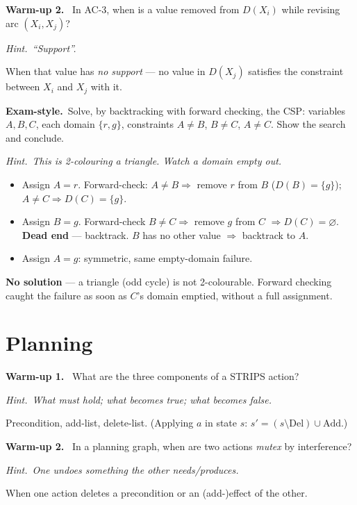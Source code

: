 \documentclass[11pt,a4paper]{article}
\newcommand{\hint}[1]{\par{\small\textcolor{accent}{\textit{Hint.}}\ \textit{#1}}\par\smallskip}
\newcommand{\warm}[1]{\smallskip\textbf{\textcolor{hi}{Warm-up #1.}}\ }
\newcommand{\exam}{\smallskip\textbf{\textcolor{warn}{Exam-style.}}\ }
\begin{document}
\warm{2} In AC-3, when is a value removed from $D(X_i)$ while revising arc $(X_i,X_j)$?
\hint{``Support''.}
\begin{sol}When that value has \emph{no support} --- no value in $D(X_j)$ satisfies the constraint between $X_i$ and $X_j$ with it.\end{sol}

\exam Solve, by backtracking with forward checking, the CSP: variables $A,B,C$, each domain $\{r,g\}$, constraints $A\ne B$, $B\ne C$, $A\ne C$. Show the search and conclude.
\hint{This is 2-colouring a triangle. Watch a domain empty out.}
\begin{sol}
\begin{itemize}[leftmargin=*,itemsep=0pt]
  \item Assign $A=r$. Forward-check: $A\ne B\Rightarrow$ remove $r$ from $B$ ($D(B)=\{g\}$); $A\ne C\Rightarrow D(C)=\{g\}$.
  \item Assign $B=g$. Forward-check $B\ne C\Rightarrow$ remove $g$ from $C$ $\Rightarrow D(C)=\varnothing$. \textbf{Dead end} --- backtrack. $B$ has no other value $\Rightarrow$ backtrack to $A$.
  \item Assign $A=g$: symmetric, same empty-domain failure.
\end{itemize}
\textbf{No solution} --- a triangle (odd cycle) is not 2-colourable. Forward checking caught the failure as soon as $C$'s domain emptied, without a full assignment.
\end{sol}

\section{Planning}

\warm{1} What are the three components of a STRIPS action?
\hint{What must hold; what becomes true; what becomes false.}
\begin{sol}Precondition, add-list, delete-list. (Applying $a$ in state $s$: $s'=(s\setminus\mathrm{Del})\cup\mathrm{Add}$.)\end{sol}

\warm{2} In a planning graph, when are two actions \emph{mutex} by interference?
\hint{One undoes something the other needs/produces.}
\begin{sol}When one action deletes a precondition or an (add-)effect of the other.\end{sol}
\end{document}
